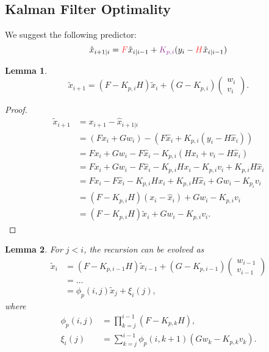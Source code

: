 \documentclass[a4 paper]{article}
\numberwithin{equation}{section}
\theoremstyle{boldStyle}
\theoremstyle{boldBlueStyle}
\newtheorem{lemma}{Lemma}[section]
\theoremstyle{boldPurpleStyle}
\theoremstyle{boldRedStyle}
\begin{document}
\subsection*{Kalman Filter Optimality}

We suggest the following predictor:
\begin{equation}
    \hat{x}_{i+1|i} = \tred{F} \hat{x}_{i|i-1} + \tpur{K_{p,i}} (y_i - \tred{H} \hat{x}_{i|i-1})
\end{equation}

\begin{lemma}
  \begin{equation}
    \tilde{x}_{i+1} = (F - K_{p,i} H) \tilde{x}_i + (G - K_{p,i}) 
    \begin{pmatrix}
    w_i \\
    v_i
    \end{pmatrix}.
    \end{equation}
\end{lemma}

\begin{proof}
\begin{align*}
\tilde{x}_{i+1} &= x_{i+1} - \hat{x}_{i+1|i} \\
&= (F x_i + G w_i) - \left( F \hat{x}_i + K_{p,i} (y_i - H \hat{x}_i) \right) \\
&= F x_i + G w_i - F \hat{x}_i - K_{p,i} (H x_i + v_i - H \hat{x}_i) \\
&= F x_i + G w_i - F \hat{x}_i - K_{p,i} H x_i - K_{p,i} v_i + K_{p,i} H \hat{x}_i \\
&= F x_i - F \hat{x}_i - K_{p,i} H x_i + K_{p,i} H \hat{x}_i + G w_i - K_{p_i} v_i \\
&= (F - K_{p,i} H)(x_i - \hat{x}_i) + G w_i - K_{p,i} v_i \\
&= (F - K_{p,i} H) \tilde{x}_i + G w_i - K_{p,i} v_i.
\end{align*}
\end{proof}


\begin{lemma}
  For \( j < i \), the recursion can be evolved as
  \begin{align*}
      \tilde{x}_i &= (F - K_{p,i-1}H) \tilde{x}_{i-1} + (G - K_{p,i-1})
      \begin{pmatrix}
          w_{i-1} \\
          v_{i-1}
      \end{pmatrix} \\
      &= \ldots \\
      &= \phi_p(i, j) \tilde{x}_j + \xi_i(j),
  \end{align*}
  where
  \begin{align*}
      \phi_p(i, j) &= \prod_{k=j}^{i-1} (F - K_{p,k}H), \\
      \xi_i(j) &= \sum_{k=j}^{i-1} \phi_p(i, k+1) (G w_k - K_{p,k} v_k).
  \end{align*}
  \end{lemma}  
\end{document}
